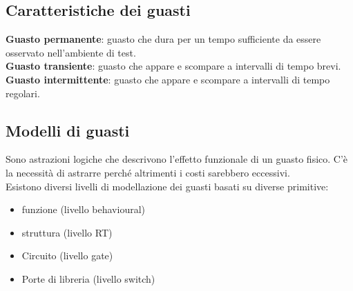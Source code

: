\documentclass[a4paper]{article}
\theoremstyle{definition}
\begin{document}
		\subsection{Caratteristiche dei guasti}
			\textbf{Guasto permanente}: guasto che dura per un tempo sufficiente da essere osservato nell'ambiente di test.\\
			\textbf{Guasto transiente}: guasto che appare e scompare a intervalli di tempo brevi.\\
			\textbf{Guasto intermittente}: guasto che appare e scompare a intervalli di tempo regolari.
			
		\subsection{Modelli di guasti}
			Sono astrazioni logiche che descrivono l'effetto funzionale di un guasto fisico. C'è la necessità di astrarre perché altrimenti i costi sarebbero eccessivi.\\
			Esistono diversi livelli di modellazione dei guasti basati su diverse primitive:
			\begin{itemize}
				\item funzione (livello behavioural)
				\item struttura (livello RT)
				\item Circuito (livello gate)
				\item Porte di libreria (livello switch)
			\end{itemize}
			
\end{document}
